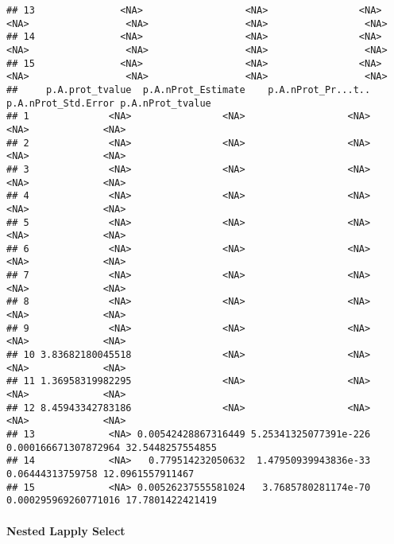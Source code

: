 \documentclass[
]{book}
\begin{document}
\begin{verbatim}
## 13               <NA>                  <NA>                <NA>             <NA>                 <NA>                 <NA>                 <NA>
## 14               <NA>                  <NA>                <NA>             <NA>                 <NA>                 <NA>                 <NA>
## 15               <NA>                  <NA>                <NA>             <NA>                 <NA>                 <NA>                 <NA>
##     p.A.prot_tvalue  p.A.nProt_Estimate    p.A.nProt_Pr...t..  p.A.nProt_Std.Error p.A.nProt_tvalue
## 1              <NA>                <NA>                  <NA>                 <NA>             <NA>
## 2              <NA>                <NA>                  <NA>                 <NA>             <NA>
## 3              <NA>                <NA>                  <NA>                 <NA>             <NA>
## 4              <NA>                <NA>                  <NA>                 <NA>             <NA>
## 5              <NA>                <NA>                  <NA>                 <NA>             <NA>
## 6              <NA>                <NA>                  <NA>                 <NA>             <NA>
## 7              <NA>                <NA>                  <NA>                 <NA>             <NA>
## 8              <NA>                <NA>                  <NA>                 <NA>             <NA>
## 9              <NA>                <NA>                  <NA>                 <NA>             <NA>
## 10 3.83682180045518                <NA>                  <NA>                 <NA>             <NA>
## 11 1.36958319982295                <NA>                  <NA>                 <NA>             <NA>
## 12 8.45943342783186                <NA>                  <NA>                 <NA>             <NA>
## 13             <NA> 0.00542428867316449 5.25341325077391e-226 0.000166671307872964 32.5448257554855
## 14             <NA>   0.779514232050632  1.47950939943836e-33     0.06444313759758 12.0961557911467
## 15             <NA> 0.00526237555581024   3.7685780281174e-70 0.000295969260771016 17.7801422421419
\end{verbatim}

\hypertarget{nested-lapply-select}{%
\paragraph{Nested Lapply Select}\label{nested-lapply-select}}
\end{document}
